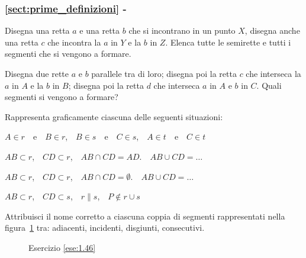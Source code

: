 \begingroup
\hypersetup{linkcolor=black}
\subsubsection*{\ref{sect:prime_definizioni} - 
}
\endgroup

\begin{esercizio}
\label{ese:1.43}
Disegna una retta $a$ e una retta $b$ che si incontrano in un punto 
$X$, disegna anche una retta $c$ che incontra la $a$ in $Y$ e la $b$ 
in $Z$. Elenca tutte le semirette e tutti i segmenti che si vengono a 
formare.
\end{esercizio}

\begin{esercizio}
\label{ese:1.44}
Disegna due rette $a$ e $b$ parallele tra di loro; disegna poi la 
retta $c$ che interseca la $a$ in $A$ e la $b$ in $B$; disegna poi la 
retta $d$ che interseca $a$ in $A$ e $b$ in $C$. Quali segmenti si 
vengono a formare?
\end{esercizio}

\begin{esercizio}
\label{ese:1.45}
Rappresenta graficamente ciascuna delle seguenti situazioni:
\begin{enumeratea}
\item $A\in r$~~e~~$B\in r$,~~$B\in s$~~e~~$C\in s$,~~$A\in 
t$~~e~~$C\in t$
\item $AB\subset r$,~~$CD\subset r$,~~$AB\cap CD=AD$.~~$AB\cup 
CD=\ldots{}$
\item $AB\subset r$,~~$CD\subset r$,~~$AB\cap CD=\emptyset$.~~$AB\cup 
CD=\ldots{}$
\item $AB\subset r$,~~$CD\subset s$,~~$r\parallel s$,~~$P\notin r\cup 
s$
\end{enumeratea}
\end{esercizio}

\begin{esercizio}
\label{ese:1.46}
Attribuisci il nome corretto a ciascuna coppia di segmenti 
rappresentati nella figura~\ref{fig:ese1.46} tra: adiacenti, 
incidenti, disgiunti, consecutivi.
\end{esercizio}


\begin{inaccessibleblock}
 \begin{figure}[htb]
 \centering
 \caption{Esercizio \ref{ese:1.46}}\label{fig:ese1.46}
\end{figure}
\end{inaccessibleblock}

